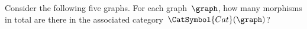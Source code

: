\vfill\pagebreak

\begin{widepar}
    \begin{gradedexercise}
        \label{ex:HowManyMorphisms}
        Consider the following five graphs.
        For each graph~$\graph$, how many morphisms in total are there in the associated category~$\CatSymbol{Cat}(\graph)$?
    \end{gradedexercise}
\end{widepar}
